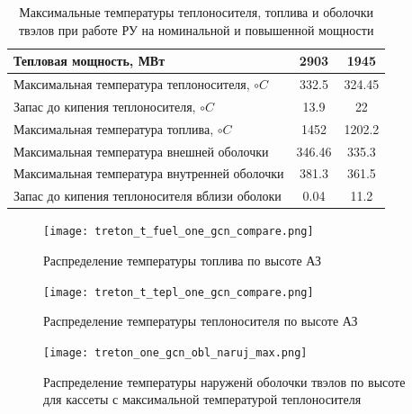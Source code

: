 \begin{table}[H]
    \caption{Максимальные температуры теплоносителя, топлива и оболочки твэлов при работе РУ на номинальной и повышенной мощности}
    \begin{center}
        \begin{tabular}{|l|c|c|}
        \toprule
        Тепловая мощность, МВт & 2903 & 1945 \\
        \midrule
        \hline
        Максимальная температура теплоносителя, $\circ C$ & 332.5 & 324.45  \\ 
        \hline
        Запас до кипения теплоносителя, $\circ C$ & 13.9 &  22 \\
        \hline
        Максимальная температура топлива, $\circ C$ & 1452 & 1202.2  \\
        \hline
        Максимальная температура внешней оболочки & 346.46 & 335.3 \\
        \hline
        Максимальная температура внутренней оболочки & 381.3 & 361.5 \\
        \hline
        Запас до кипения теплоносителя вблизи оболоки & 0.04 & 11.2 \\
        \bottomrule
        \end{tabular}
		\label{tabular:t-one-gcn-nominal-compare}
    \end{center}
\end{table}

\begin{figure}[H]
	\begin{center}
		\texttt{[image: treton\_t\_fuel\_one\_gcn\_compare.png]}
		\caption{Распределение температуры топлива по высоте АЗ}
		\label{pic:treton-t-fuel-one-gcn-compare} %
	\end{center}
\end{figure}

\begin{figure}[H]
	\begin{center}
		\texttt{[image: treton\_t\_tepl\_one\_gcn\_compare.png]}
		\caption{Распределение температуры теплоносителя по высоте АЗ}
		\label{pic:treton-t-tepl-one-gcn-compare} %
	\end{center}
\end{figure}

\begin{figure}[H]
	\begin{center}
		\texttt{[image: treton\_one\_gcn\_obl\_naruj\_max.png]}
		\caption{Распределение температуры наруженй оболочки твэлов по высоте для кассеты с максимальной температурой теплоносителя}
		\label{pic:treton-one-gcn-obl-naruj-max} %
	\end{center}
\end{figure}

